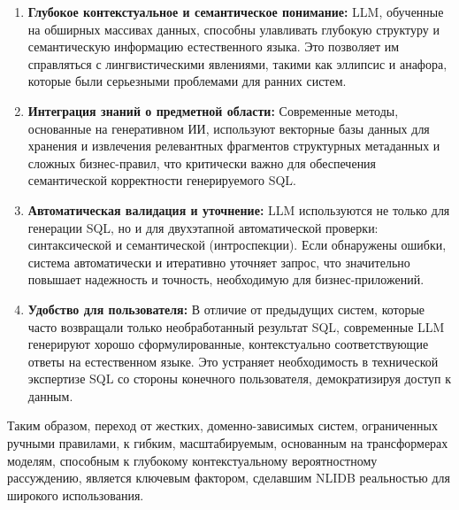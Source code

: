 \begin{enumerate}
    \item \textbf{Глубокое контекстуальное и семантическое понимание:} LLM, обученные на обширных массивах данных, способны улавливать глубокую структуру и семантическую информацию естественного языка. Это позволяет им справляться с лингвистическими явлениями, такими как эллипсис и анафора, которые были серьезными проблемами для ранних систем.
    \item \textbf{Интеграция знаний о предметной области:} Современные методы, основанные на генеративном ИИ, используют векторные базы данных для хранения и извлечения релевантных фрагментов структурных метаданных и сложных бизнес-правил, что критически важно для обеспечения семантической корректности генерируемого SQL.
    \item \textbf{Автоматическая валидация и уточнение:} LLM используются не только для генерации SQL, но и для двухэтапной автоматической проверки: синтаксической и семантической (интроспекции). Если обнаружены ошибки, система автоматически и итеративно уточняет запрос, что значительно повышает надежность и точность, необходимую для бизнес-приложений.
    \item \textbf{Удобство для пользователя:} В отличие от предыдущих систем, которые часто возвращали только необработанный результат SQL, современные LLM генерируют хорошо сформулированные, контекстуально соответствующие ответы на естественном языке. Это устраняет необходимость в технической экспертизе SQL со стороны конечного пользователя, демократизируя доступ к данным.
\end{enumerate}

Таким образом, переход от жестких, доменно-зависимых систем, ограниченных ручными правилами, к гибким, масштабируемым, основанным на трансформерах моделям, способным к глубокому контекстуальному вероятностному рассуждению, является ключевым фактором, сделавшим NLIDB реальностью для широкого использования.



